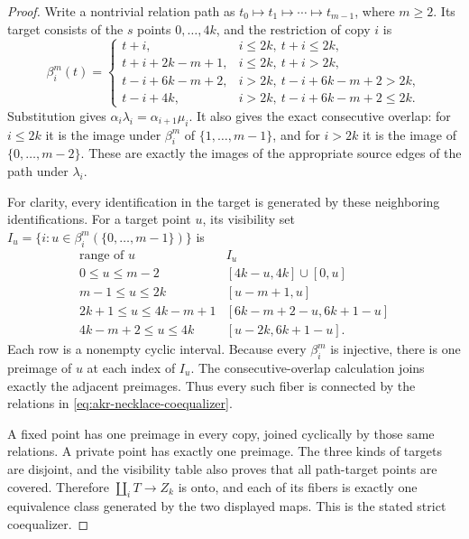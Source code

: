 \begin{proof}
Write a nontrivial relation path as
$t_0\mapsto t_1\mapsto\cdots\mapsto t_{m-1}$, where $m\geq2$.
Its target consists of the $s$ points $0,\ldots,4k$, and the restriction
of copy $i$ is
\[
 \beta_i^m(t)=
 \begin{cases}
 t+i,&i\leq2k,\ t+i\leq2k,\\
 t+i+2k-m+1,&i\leq2k,\ t+i>2k,\\
 t-i+6k-m+2,&i>2k,\ t-i+6k-m+2>2k,\\
 t-i+4k,&i>2k,\ t-i+6k-m+2\leq2k.
 \end{cases}
\]
Substitution gives $\alpha_i\lambda_i=\alpha_{i+1}\mu_i$.
It also gives the exact consecutive overlap: for $i\leq2k$ it is
the image under $\beta_i^m$ of $\{1,\ldots,m-1\}$, and for $i>2k$
it is the image of $\{0,\ldots,m-2\}$. These are exactly the images
of the appropriate source edges of the path under $\lambda_i$.

For clarity, every identification in the target is generated by these
neighboring identifications. For a target point $u$, its visibility
set $I_u=\{i:u\in\beta_i^m(\{0,\ldots,m-1\})\}$ is
\[
\begin{array}{c|c}
\text{range of }u&I_u\\\hline
0\leq u\leq m-2&[4k-u,4k]\cup[0,u]\\
m-1\leq u\leq2k&[u-m+1,u]\\
2k+1\leq u\leq4k-m+1&[6k-m+2-u,6k+1-u]\\
4k-m+2\leq u\leq4k&[u-2k,6k+1-u].
\end{array}
\]
Each row is a nonempty cyclic interval. Because every $\beta_i^m$
is injective, there is one preimage of $u$ at each index of $I_u$.
The consecutive-overlap calculation joins exactly the adjacent
preimages. Thus every such fiber is connected by the relations in
\eqref{eq:akr-necklace-coequalizer}.

A fixed point has one preimage in every copy, joined cyclically by
those same relations. A private point has exactly one preimage.
The three kinds of targets are disjoint, and the visibility table
also proves that all path-target points are covered. Therefore
$\coprod_iT\to Z_k$ is onto, and each of its fibers is exactly one
equivalence class generated by the two displayed maps. This is the
stated strict coequalizer.
\end{proof}


